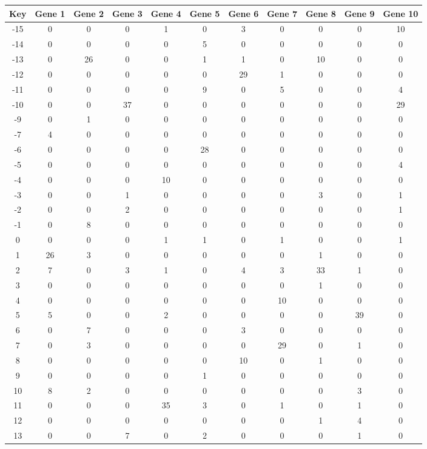 \begin{tabular}{|c|c|c|c|c|c|c|c|c|c|c|}
\hline
Key & Gene 1 & Gene 2 & Gene 3 & Gene 4 & Gene 5 & Gene 6 & Gene 7 & Gene 8 & Gene 9 & Gene 10 \\
\hline
-15 & 0 & 0 & 0 & 1 & 0 & 3 & 0 & 0 & 0 & 10 \\
-14 & 0 & 0 & 0 & 0 & 5 & 0 & 0 & 0 & 0 & 0 \\
-13 & 0 & 26 & 0 & 0 & 1 & 1 & 0 & 10 & 0 & 0 \\
-12 & 0 & 0 & 0 & 0 & 0 & 29 & 1 & 0 & 0 & 0 \\
-11 & 0 & 0 & 0 & 0 & 9 & 0 & 5 & 0 & 0 & 4 \\
-10 & 0 & 0 & 37 & 0 & 0 & 0 & 0 & 0 & 0 & 29 \\
-9 & 0 & 1 & 0 & 0 & 0 & 0 & 0 & 0 & 0 & 0 \\
-7 & 4 & 0 & 0 & 0 & 0 & 0 & 0 & 0 & 0 & 0 \\
-6 & 0 & 0 & 0 & 0 & 28 & 0 & 0 & 0 & 0 & 0 \\
-5 & 0 & 0 & 0 & 0 & 0 & 0 & 0 & 0 & 0 & 4 \\
-4 & 0 & 0 & 0 & 10 & 0 & 0 & 0 & 0 & 0 & 0 \\
-3 & 0 & 0 & 1 & 0 & 0 & 0 & 0 & 3 & 0 & 1 \\
-2 & 0 & 0 & 2 & 0 & 0 & 0 & 0 & 0 & 0 & 1 \\
-1 & 0 & 8 & 0 & 0 & 0 & 0 & 0 & 0 & 0 & 0 \\
0 & 0 & 0 & 0 & 1 & 1 & 0 & 1 & 0 & 0 & 1 \\
1 & 26 & 3 & 0 & 0 & 0 & 0 & 0 & 1 & 0 & 0 \\
2 & 7 & 0 & 3 & 1 & 0 & 4 & 3 & 33 & 1 & 0 \\
3 & 0 & 0 & 0 & 0 & 0 & 0 & 0 & 1 & 0 & 0 \\
4 & 0 & 0 & 0 & 0 & 0 & 0 & 10 & 0 & 0 & 0 \\
5 & 5 & 0 & 0 & 2 & 0 & 0 & 0 & 0 & 39 & 0 \\
6 & 0 & 7 & 0 & 0 & 0 & 3 & 0 & 0 & 0 & 0 \\
7 & 0 & 3 & 0 & 0 & 0 & 0 & 29 & 0 & 1 & 0 \\
8 & 0 & 0 & 0 & 0 & 0 & 10 & 0 & 1 & 0 & 0 \\
9 & 0 & 0 & 0 & 0 & 1 & 0 & 0 & 0 & 0 & 0 \\
10 & 8 & 2 & 0 & 0 & 0 & 0 & 0 & 0 & 3 & 0 \\
11 & 0 & 0 & 0 & 35 & 3 & 0 & 1 & 0 & 1 & 0 \\
12 & 0 & 0 & 0 & 0 & 0 & 0 & 0 & 1 & 4 & 0 \\
13 & 0 & 0 & 7 & 0 & 2 & 0 & 0 & 0 & 1 & 0 \\
\hline
\end{tabular}